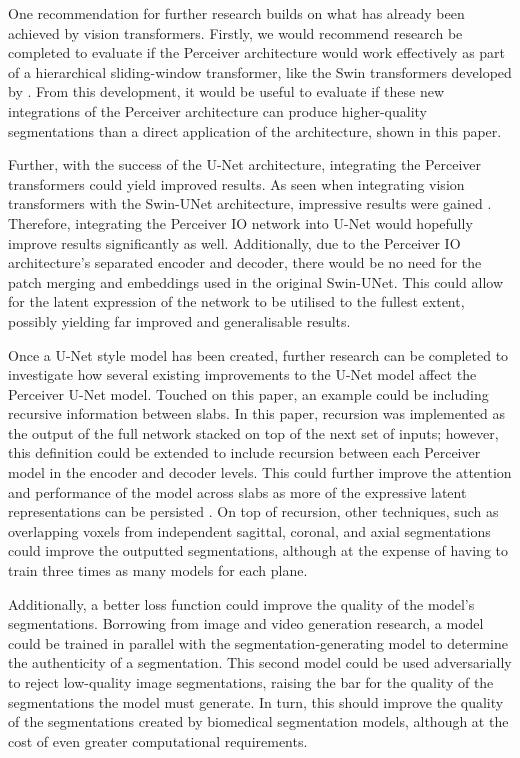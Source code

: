 \documentclass{l4proj}
\begin{document}
One recommendation for further research builds on what has already been achieved by vision transformers. Firstly, we would recommend research be completed to evaluate if the Perceiver architecture would work effectively as part of a hierarchical sliding-window transformer, like the Swin transformers developed by \cite{liu2021swin}. From this development, it would be useful to evaluate if these new integrations of the Perceiver architecture can produce higher-quality segmentations than a direct application of the architecture, shown in this paper.

Further, with the success of the U-Net architecture, integrating the Perceiver transformers could yield improved results. As seen when integrating vision transformers with the Swin-UNet architecture, impressive results were gained \citep{cao2023swin}. Therefore, integrating the Perceiver IO network into U-Net would hopefully improve results significantly as well. Additionally, due to the Perceiver IO architecture’s separated encoder and decoder, there would be no need for the patch merging and embeddings used in the original Swin-UNet. This could allow for the latent expression of the network to be utilised to the fullest extent, possibly yielding far improved and generalisable results.

Once a U-Net style model has been created, further research can be completed to investigate how several existing improvements to the U-Net model affect the Perceiver U-Net model. Touched on this paper, an example could be including recursive information between slabs. In this paper, recursion was implemented as the output of the full network stacked on top of the next set of inputs; however, this definition could be extended to include recursion between each Perceiver model in the encoder and decoder levels. This could further improve the attention and performance of the model across slabs as more of the expressive latent representations can be persisted \citep{wang2019recurrent}. On top of recursion, other techniques, such as overlapping voxels from independent sagittal, coronal, and axial segmentations could improve the outputted segmentations, although at the expense of having to train three times as many models for each plane.

Additionally, a better loss function could improve the quality of the model’s segmentations. Borrowing from image and video generation research, a model could be trained in parallel with the segmentation-generating model to determine the authenticity of a segmentation. This second model could be used adversarially to reject low-quality image segmentations, raising the bar for the quality of the segmentations the model must generate. In turn, this should improve the quality of the segmentations created by biomedical segmentation models, although at the cost of even greater computational requirements.
\end{document}
